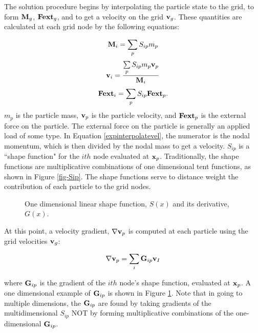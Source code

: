 The solution procedure begins by interpolating the particle 
state to the
grid, to form $\mbox{\ensuremath{\mathbf{M}}}_g$, $\mbox{\ensuremath{\mathbf{Fext}}}_g$, and to get a velocity 
on the grid
$\mbox{\ensuremath{\mathbf{v}}}_g$.  These quantities are calculated at each grid
node by the following equations:

\begin{equation}
        \mbox{\ensuremath{\mathbf{M}}}_i = \sum_{p} S_{ip} m_p  
\label{expinterpolatemass}
\end{equation}
\begin{equation}
        \mbox{\ensuremath{\mathbf{v}}}_i = \frac{\sum\limits_{p} S_{ip} m_p 
\mbox{\ensuremath{\mathbf{v}}}_p}{\mbox{\ensuremath{\mathbf{M}}}_i} \label{expinterpolatevel}
\end{equation}
\begin{equation}
        \mbox{\ensuremath{\mathbf{Fext}}}_i = \sum_{p} S_{ip} \mbox{\ensuremath{\mathbf{Fext}}}_p. 
\label{expinterpolateFext}
\end{equation}
$m_p$ is the particle
mass, $\mbox{\ensuremath{\mathbf{v}}}_p$ is the particle velocity, and $\mbox{\ensuremath{\mathbf{Fext}}}_p$ is 
the external
force on the particle.  The external force on the particle is 
generally an applied load of some type.  In Equation 
\ref{expinterpolatevel}, the numerator is the nodal momentum, 
which is then divided by the nodal mass to get a velocity.  
$S_{ip}$ is a ``shape function" for the $ith$ node
evaluated at $\mbox{\ensuremath{\mathbf{x}}}_p$.  Traditionally, the shape functions are 
multiplicative
combinations of one dimensional tent functions, as shown in
Figure \ref{fig-Sip}.  The shape functions serve to distance 
weight the contribution of each particle to the grid nodes.  

\begin{figure}[htbp!]
  \centering
   \hspace{24pt}
  \caption{\label{fig-Sip} One dimensional linear shape function, 
           $S(x)$ and its derivative, $G(x)$.}
  \label{fig-Gip}
\end{figure}

At this point, a velocity gradient,  $\nabla \mbox{\ensuremath{\mathbf{v}}}_p$ is 
computed at
each particle using the grid velocities $\mbox{\ensuremath{\mathbf{v}}}_g$:

\begin{equation}
	\nabla \mbox{\ensuremath{\mathbf{v}}}_p = \sum_i \mbox{\ensuremath{\mathbf{G}}}_{ip} \mbox{\ensuremath{\mathbf{v}}}_I
 \label{velgrad}
\end{equation}

\noindent
where $\mbox{\ensuremath{\mathbf{G}}}_{ip}$ is the gradient of the $ith$ node's shape 
function,
evaluated at $\mbox{\ensuremath{\mathbf{x}}}_p$.  A one dimensional example of 
$\mbox{\ensuremath{\mathbf{G}}}_{ip}$ is
shown in Figure \ref{fig-Gip}.  Note that in going to multiple dimensions,
the $\mbox{\ensuremath{\mathbf{G}}}_{ip}$ are found by taking gradients of the multidimensional
$S_{ip}$ NOT by forming multiplicative combinations of the one-dimensional
$\mbox{\ensuremath{\mathbf{G}}}_{ip}$.

